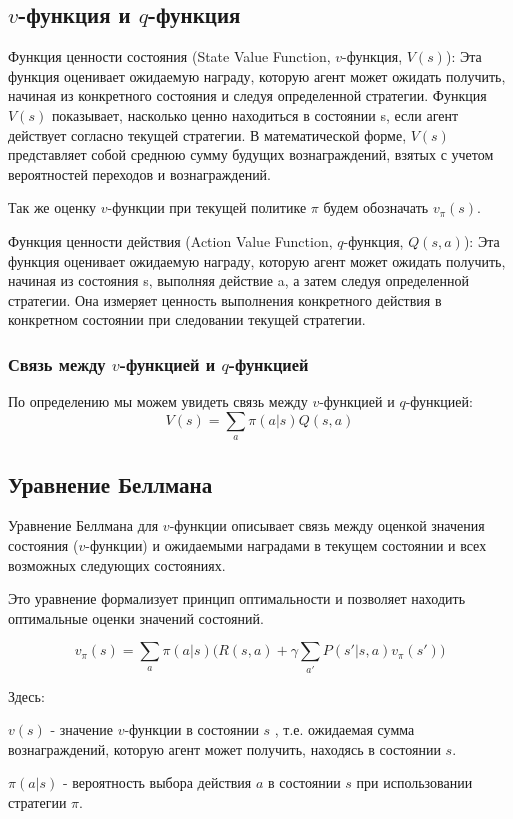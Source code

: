 \subsection{$v$-функция и $q$-функция}
Функция ценности состояния (State Value Function, $v$-функция, $V(s)$): Эта функция оценивает ожидаемую награду, которую агент может ожидать получить, начиная из конкретного состояния и следуя определенной стратегии. Функция $V(s)$ показывает, насколько ценно находиться в состоянии s, если агент действует согласно текущей стратегии. В математической форме, $V(s)$ представляет собой среднюю сумму будущих вознаграждений, взятых с учетом вероятностей переходов и вознаграждений.

Так же оценку $v$-функции при текущей политике $\pi$ будем обозначать $v_{\pi}(s)$.


Функция ценности действия (Action Value Function, $q$-функция, $Q(s, a)$): Эта функция оценивает ожидаемую награду, которую агент может ожидать получить, начиная из состояния s, выполняя действие a, а затем следуя определенной стратегии. Она измеряет ценность выполнения конкретного действия в конкретном состоянии при следовании текущей стратегии.

\subsubsection{Связь между $v$-функцией и $q$-функцией}
По определению мы можем увидеть связь между $v$-функцией и $q$-функцией:
$$ V(s) = \sum_{a}\pi(a|s)Q(s,a) $$

\subsection{Уравнение Беллмана}

Уравнение Беллмана для $v$-функции описывает связь между оценкой значения состояния ($v$-функции) и ожидаемыми наградами в текущем состоянии и всех возможных следующих состояниях.

Это уравнение формализует принцип оптимальности и позволяет находить оптимальные оценки значений состояний.

$$v_{\pi}(s)=\sum_{a}\pi(a|s)\Big( R(s, a) + \gamma \sum_{a'}P(s'|s, a)v_{\pi}(s') \Big)$$

Здесь:

$v(s)$ - значение $v$-функции в состоянии $s$ , т.е. ожидаемая сумма вознаграждений,
которую агент может получить, находясь в состоянии $s$.

$\pi(a|s)$ - вероятность выбора действия $a$ в состоянии $s$ при использовании стратегии $\pi$.

